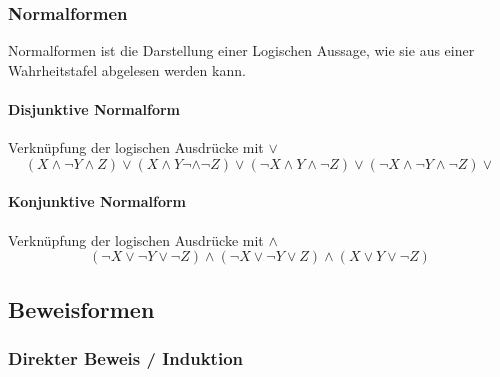 \begin{multicols}{2}
\begin{description}
	\end{description}


\subsubsection{Normalformen}
	Normalformen ist die Darstellung einer Logischen Aussage, wie sie aus einer Wahrheitstafel abgelesen werden kann.
	
	\paragraph{Disjunktive Normalform}
		
		Verknüpfung der logischen Ausdrücke mit $\lor$
		\[
			(X \land \neg Y \land Z) \lor
			(X \land Y \neg \land \neg Z) \lor
			(\neg X \land Y \land \neg Z) \lor
			(\neg X \land \neg Y \land \neg Z) \lor 
		\]
	
	\paragraph{Konjunktive Normalform}
		
		Verknüpfung der logischen Ausdrücke mit $\land$
		\[
			(\neg X \lor \neg Y \lor \neg Z) \land
			(\neg X \lor \neg Y \lor Z) \land
			(X \lor Y \lor \neg Z)
		\]
		
		

\subsection{Beweisformen}

\subsubsection{Direkter Beweis / Induktion }

\end{multicols}


